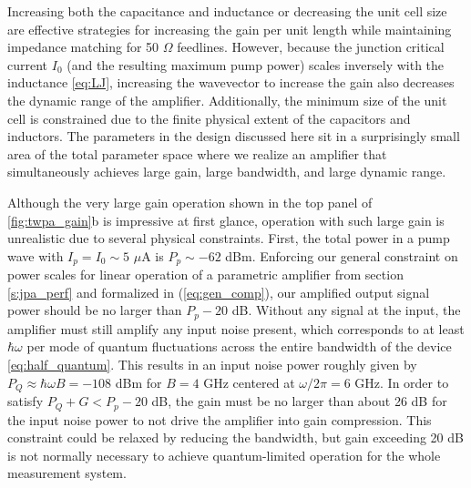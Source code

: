 Increasing both the capacitance and inductance or decreasing the unit cell size are effective strategies for increasing the gain per unit length while maintaining impedance matching for 50 $\Omega$ feedlines.  However, because the junction critical current $I_0$ (and the resulting maximum pump power) scales inversely with the inductance \eqref{eq:LJ}, increasing the wavevector to increase the gain also decreases the dynamic range of the amplifier.  Additionally, the minimum size of the unit cell is constrained due to the finite physical extent of the capacitors and inductors. The parameters in the design discussed here sit in a surprisingly small area of the total parameter space where we realize an amplifier that simultaneously achieves large gain, large bandwidth, and large dynamic range.

Although the very large gain operation shown in the top panel of \ref{fig:twpa_gain}b is impressive at first glance, operation with such large gain is unrealistic due to several physical constraints.  First, the total power in a pump wave with $I_p = I_0 \sim 5$ $\mu$A is $P_p \sim -62$ dBm.  Enforcing our general constraint on power scales for linear operation of a parametric amplifier from section \ref{s:jpa_perf} and formalized in (\ref{eq:gen_comp}), our amplified output signal power should be no larger than $P_p - 20$ dB.  Without any signal at the input, the amplifier must still amplify any input noise present, which corresponds to at least $\hbar \omega$ per mode of quantum fluctuations across the entire bandwidth of the device \eqref{eq:half_quantum}.  This results in an input noise power roughly given by $P_Q \approx \hbar \omega B = -108$ dBm for $B = 4$ GHz centered at $\omega/2 \pi = 6$ GHz.  In order to satisfy $P_Q + G < P_p - 20$ dB, the gain must be no larger than about 26 dB for the input noise power to not drive the amplifier into gain compression.  This constraint could be relaxed by reducing the bandwidth, but gain exceeding 20 dB is not normally necessary to achieve quantum-limited operation for the whole measurement system.

